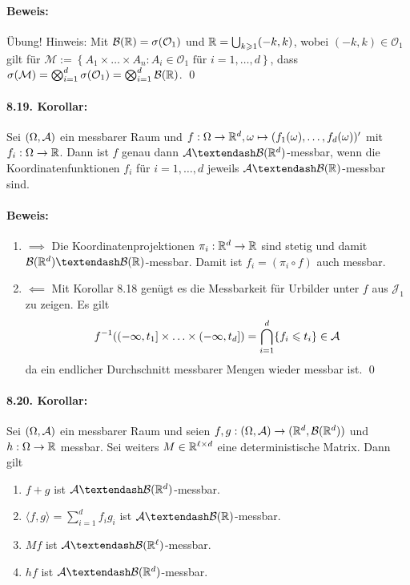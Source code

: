 \paragraph{Beweis:}\"Ubung! Hinweis: Mit $\mathcal{B}(\mathbb{R})=\sigma(\mathcal{O}_1)$ und $\mathbb{R}=\bigcup_{k\geqslant1}(-k,k)$, wobei $(-k,k)\in\mathcal{O}_1$ gilt f\"ur $\mathcal{M}:=\left\{A_1\times\hdots\times A_n:A_i\in\mathcal{O}_1\text{ f\"ur }i=1,\hdots,d\right\}$, dass $\sigma(\mathcal{M})=\bigotimes_{i=1}^d\sigma(\mathcal{O}_1)=\bigotimes_{i=1}^d\mathcal{B}(\mathbb{R})$. \qed

\paragraph{8.19. Korollar:}Sei $(\Omega,\mathcal{A})$ ein messbarer Raum und $f:\Omega\to\mathbb{R}^d,\omega\mapsto(f_1(\omega),\hdots,f_d(\omega))'$ mit $f_i:\Omega\to\mathbb{R}$. Dann ist $f$ genau dann $\A\textendash\mathcal{B}(\R^d)$-messbar, wenn die Koordinatenfunktionen $f_i$ f\"ur $i=1,\hdots,d$ jeweils $\A\textendash\borel$-messbar sind.

\paragraph{Beweis:}
\begin{enumerate}[label=\Roman*.]
    \item $\implies$\newline
    Die Koordinatenprojektionen $\pi_i:\mathbb{R}^d\to\mathbb{R}$ sind stetig und damit $\mathcal{B}(\R^d)\textendash\borel$-messbar. Damit ist $f_i=(\pi_i\circ f)$ auch messbar.
    \item $\impliedby$\newline
    Mit Korollar 8.18 gen\"ugt es die Messbarkeit f\"ur Urbilder unter $f$ aus $\mathcal{J_1}$ zu zeigen. Es gilt
    $$f^{-1}((-\infty,t_1]\times\hdots\times(-\infty,t_d])=\bigcap_{i=1}^d\{f_i\leqslant t_i\}\in\mathcal{A}$$
    da ein endlicher Durchschnitt messbarer Mengen wieder messbar ist. \qed
\end{enumerate}

\paragraph{8.20. Korollar:}Sei $(\Omega,\mathcal{A})$ ein messbarer Raum und seien $f,g:(\Omega,\mathcal{A})\to(\mathbb{R}^d,\mathcal{B}(\mathbb{R}^d))$ und $h:\Omega\to\mathbb{R}$ messbar. Sei weiters $M\in\mathbb{R}^{\ell\times d}$ eine deterministische Matrix. Dann gilt
\begin{enumerate}[label=(\roman*)]
    \item $f+g$ ist $\A\textendash\mathcal{B}(\R^d)$-messbar.
    \item $\langle f,g\rangle=\displaystyle\sum_{i=1}^d f_i g_i$ ist $\A\textendash\borel$-messbar.
    \item $Mf$ ist $\A\textendash\mathcal{B}(\R^\ell)$-messbar.
    \item $hf$ ist $\A\textendash\mathcal{B}(\R^d)$-messbar.
\end{enumerate}

